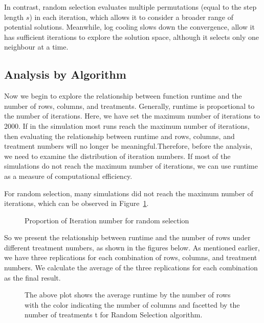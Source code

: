 \documentclass[
  a4paper,
  oneside,
  openany,
  12pt,
  onecolumn]{book}
\theoremstyle{definition}
\theoremstyle{definition}
\theoremstyle{plain}
\theoremstyle{remark}
\begin{document}
In contrast, random selection evaluates multiple permutations (equal to
the step length \(s\)) in each iteration, which allows it to consider a
broader range of potential solutions. Meanwhile, log cooling slows down
the convergence, allow it has sufficient iterations to explore the
solution space, although it selects only one neighbour at a time.

\subsection{Analysis by Algorithm}\label{analysis-by-algorithm}

Now we begin to explore the relationship between function runtime and
the number of rows, columns, and treatments. Generally, runtime is
proportional to the number of iterations. Here, we have set the maximum
number of iterations to 2000. If in the simulation most runs reach the
maximum number of iterations, then evaluating the relationship between
runtime and rows, columns, and treatment numbers will no longer be
meaningful.Therefore, before the analysis, we need to examine the
distribution of iteration numbers. If most of the simulations do not
reach the maximum number of iterations, we can use runtime as a measure
of computational efficiency.

For random selection, many simulations did not reach the maximum number
of iterations, which can be observed in
Figure~\ref{fig-iteration-ditribution-RS}.

\begin{figure}


\caption{\label{fig-iteration-ditribution-RS}Proportion of Iteration
number for random selection}

\end{figure}%

So we present the relationship between runtime and the number of rows
under different treatment numbers, as shown in the figures below. As
mentioned earlier, we have three replications for each combination of
rows, columns, and treatment numbers. We calculate the average of the
three replications for each combination as the final result.

\begin{figure}


\caption{\label{fig-RvTRS}The above plot shows the average runtime by
the number of rows with the color indicating the number of columns and
facetted by the number of treatments t for Random Selection algorithm.}

\end{figure}%
\end{document}
